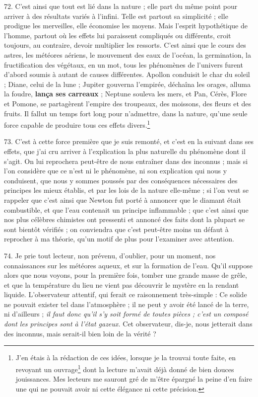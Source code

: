 \documentclass[a4paper, 11pt, oneside, polutonikogreek, french]{article}
\begin{document}
72. C'est ainsi que tout est lié dans la nature ; elle part du même point pour arriver à des résultats variés à l'infini. \og Telle est partout sa simplicité ; elle prodigue les merveilles, elle économise les moyens. Mais l'esprit hypothétique de l'homme, partout où les effets lui paraissent compliqués ou différents, croit toujours, au contraire, devoir multiplier les ressorts. C'est ainsi que le cours des astres, les météores aériens, le mouvement des eaux de l'océan, la germination, la fructification des végétaux, en un mot, tous les phénomènes de l'univers furent d'abord soumis à autant de causes différentes. Apollon conduisit le char du soleil ; Diane, celui de la lune ; Jupiter gouverna l'empirée, déchaîna les orages, alluma la foudre, \textbf{lança ses carreaux} ; Neptune souleva les mers, et Pan, Cérès, Flore et Pomone, se partagèrent l'empire des troupeaux, des moissons, des fleurs et des fruits. Il fallut un temps fort long pour n'admettre, dans la nature, qu'une seule force capable de produire tous ces effets divers.\footnote{J'en étais à la rédaction de ces idées, lorsque je la trouvai toute faite, en revoyant un ouvrage\footnote{Rapports du physique et du moral de l'homme, par P. J. G. Cabanis, Membre du Sénat Conservateur, de l'Institut national, \emph{etc.}, t. 1er., p. 591.} dont la lecture m'avait déjà donné de bien douces jouissances. Mes lecteurs me sauront gré de m'être épargné la peine d'en faire une qui ne pouvait avoir ni cette élégance ni cette précision.} \fg

73. C'est à cette force première que je suis remonté, et c'est en la suivant dans ses effets, que j'ai cru arriver à l'explication la plus naturelle du phénomène dont il s'agit. On lui reprochera peut-être de nous entraîner dans des inconnus ; mais si l'on considère que ce n'est ni le phénomène, ni son explication qui nous y conduisent, que nous y sommes poussés par des conséquences nécessaires des principes les mieux établis, et par les lois de la nature elle-même ; si l'on veut se rappeler que c'est ainsi que Newton fut porté à annoncer que le diamant était combustible, et que l'eau contenait un principe inflammable ; que c'est ainsi que nos plus célèbres chimistes ont pressenti et annoncé des faits dont la plupart se sont bientôt vérifiés ; on conviendra que c'est peut-être moins un défaut à reprocher à ma théorie, qu'un motif de plus pour l'examiner avec attention.

74. Je prie tout lecteur, non prévenu, d'oublier, pour un moment, nos connaissances sur les météores aqueux, et sur la formation de l'eau. Qu'il suppose alors que nous voyons, pour la première fois, tomber une grande masse de grêle, et que la température du lieu ne vient pas découvrir le mystère en la rendant liquide. L'observateur attentif, qui ferait ce raisonnement très-simple : \og Ce solide ne pouvait exister tel dans l'atmosphère ; il ne peut y avoir été lancé de la terre, ni d'ailleurs ; \emph{il faut donc qu'il s'y soit formé de toutes pièces ; c'est un composé dont les principes sont à l'état gazeux.} \fg Cet observateur, dis-je, nous jetterait dans des inconnus, mais serait-il bien loin de la vérité ?
\end{document}
